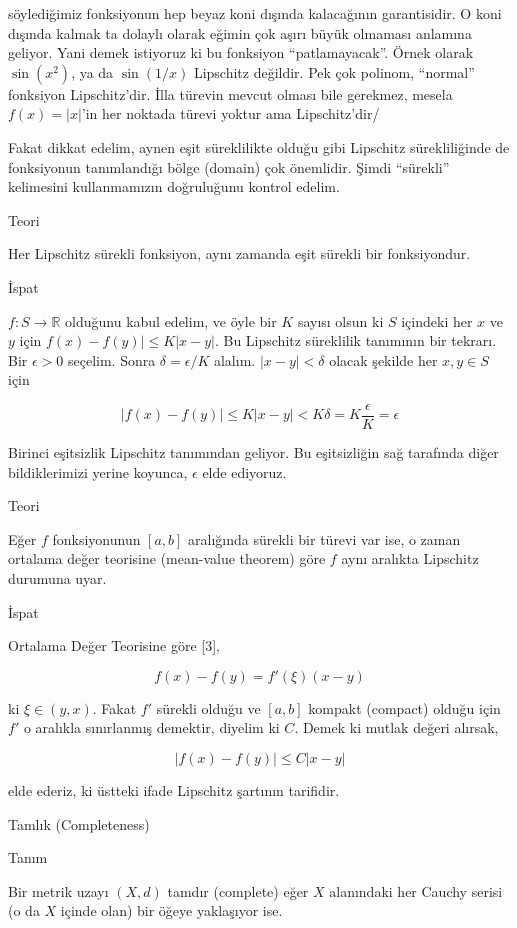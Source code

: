 \documentclass[12pt,fleqn]{article}\usepackage{../../common}
\begin{document}
söylediğimiz fonksiyonun hep beyaz koni dışında kalacağının
garantisidir. O koni dışında kalmak ta dolaylı olarak eğimin çok aşırı
büyük olmaması anlamına geliyor. Yani demek istiyoruz ki bu fonksiyon
``patlamayacak''. Örnek olarak $\sin(x^2)$, ya da $\sin(1/x)$ Lipschitz
değildir. Pek çok polinom, ``normal'' fonksiyon Lipschitz'dir. İlla türevin
mevcut olması bile gerekmez, mesela $f(x) = |x|$'in her noktada türevi
yoktur ama Lipschitz'dir/ 

Fakat dikkat edelim, aynen eşit süreklilikte olduğu gibi Lipschitz
sürekliliğinde de fonksiyonun tanımlandığı bölge (domain) çok
önemlidir. Şimdi ``sürekli'' kelimesini kullanmamızın doğruluğunu kontrol
edelim.

Teori 

Her Lipschitz sürekli fonksiyon, aynı zamanda eşit sürekli bir fonksiyondur.

İspat

$f: S \to \mathbb{R}$ olduğunu kabul edelim, ve öyle bir $K$ sayısı olsun ki $S$
içindeki her $x$ ve $y$ için $f(x) - f(y)| \le K|x-y|$. Bu Lipschitz süreklilik
tanımının bir tekrarı. Bir $\epsilon > 0$ seçelim. Sonra $\delta = \epsilon / K$
alalım.  $|x-y| < \delta$ olacak şekilde her $x,y \in S$ için

$$ |f(x) - f(y)| \le K|x-y| < K\delta = K \frac{ \epsilon}{K} = \epsilon $$

Birinci eşitsizlik Lipschitz tanımından geliyor. Bu eşitsizliğin sağ tarafında
diğer bildiklerimizi yerine koyunca, $\epsilon$ elde ediyoruz.

Teori

Eğer $f$ fonksiyonunun $[a,b]$ aralığında sürekli bir türevi var ise,
o zaman ortalama değer teorisine (mean-value theorem) göre $f$ aynı aralıkta
Lipschitz durumuna uyar.

İspat

Ortalama Değer Teorisine göre [3],

$$
f(x)-f(y) = f'(\xi)(x-y)
$$

ki $\xi \in (y,x)$. Fakat $f'$ sürekli olduğu ve $[a,b]$ kompakt (compact)
olduğu için $f'$ o aralıkla sınırlanmış demektir, diyelim ki $C$. Demek ki
mutlak değeri alırsak,

$$
|f(x)-f(y)| \le C|x-y|
$$

elde ederiz, ki üstteki ifade Lipschitz şartının tarifidir.

Tamlık (Completeness) 

Tanım

Bir metrik uzayı $(X,d)$ tamdır (complete) eğer $X$ alanındaki her Cauchy serisi
(o da $X$ içinde olan) bir öğeye yaklaşıyor ise.
\end{document}
